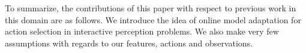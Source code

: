 %  

To summarize, the contributions of this paper with respect to previous work in this domain are as follows. We introduce the idea of online model adaptation for action selection in interactive perception problems. We also make very few assumptions with regards to our features, actions and observations.













